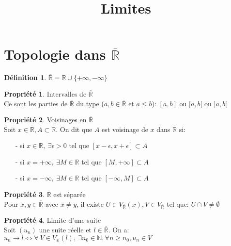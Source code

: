 \documentclass[fleqn]{article}
\title{Limites}
\date{}
\theoremstyle{definition} \newtheorem*{defi}{D\'efinition}
\theoremstyle{definition} \newtheorem*{theo}{Th\'eor\`eme}
\theoremstyle{definition} \newtheorem*{prop}{Propri\'et\'e}
\theoremstyle{remark} \newtheorem*{rqs}{Remarques}
\begin{document}
\maketitle

\section{Topologie dans $\overline{\mathbb{R}}$}
\begin{defi}
	$\overline{\mathbb{R}} = \mathbb{R} \cup \{ +\infty, -\infty\}$
\end{defi}

\begin{prop} Intervalles de $\overline{\mathbb{R}}$ \\
		Ce sont les parties de $\overline{\mathbb{R}}$ du type ($a,b \in \overline{\mathbb{R}}$ et $a \leq b$): $[a,b]$ ou $[a,b[$ ou $]a,b[$
\end{prop}

\begin{prop} Voisinages en $\overline{\mathbb{R}}$ \\
	Soit $x \in \overline{\mathbb{R}}, A \subset \overline{\mathbb{R}}$. On dit que $A$ est voisinage de $x$ dans $\overline{\mathbb{R}}$ si:
		\begin{itemize}
			\item[-] si $x \in \mathbb{R},\ \exists \epsilon > 0$ tel que $[x - \epsilon, x + \epsilon] \subset A$
			\item[-] si $x = +\infty,\ \exists M \in \mathbb{R}$ tel que $[M, +\infty] \subset A$
			\item[-] si $x = - \infty,\ \exists M \in \mathbb{R}$ tel que $[-\infty, M] \subset A$
		\end{itemize}
\end{prop}

\begin{prop} $\overline{\mathbb{R}}$ est s\'epar\'ee \\
		Pour $x, y \in \overline{\mathbb{R}}$ avec $x \neq y$, il existe $U \in V_{\overline{\mathbb{R}}}(x), V \in V_{\overline{\mathbb{R}}}$
		tel que: $U \cap V \neq \emptyset$
\end{prop}

\begin{prop} Limite d'une suite \\
	Soit $(u_n)$ une suite r\'eelle et $l \in \overline{\mathbb{R}}$. On a: \\
		$u_n \rightarrow l \Leftrightarrow \forall\ V \in V_{\overline{\mathbb{R}}}(l),\ \exists n_0 \in \mathbb{N}, \forall n \geq n_0, u_n
		\in V$
\end{prop}
\end{document}
